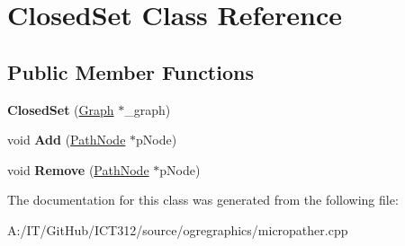 \hypertarget{class_closed_set}{\section{Closed\-Set Class Reference}
\label{class_closed_set}
}
\subsection*{Public Member Functions}
\begin{DoxyCompactItemize}
\item 
\hypertarget{class_closed_set_acf6657729a6bbc37fb44c8c3c582185c}{{\bfseries Closed\-Set} (\hyperlink{classmicropather_1_1_graph}{Graph} $\ast$\-\_\-graph)}\label{class_closed_set_acf6657729a6bbc37fb44c8c3c582185c}

\item 
\hypertarget{class_closed_set_a76c0f439e938b9229f5adff9cd89ab71}{void {\bfseries Add} (\hyperlink{classmicropather_1_1_path_node}{Path\-Node} $\ast$p\-Node)}\label{class_closed_set_a76c0f439e938b9229f5adff9cd89ab71}

\item 
\hypertarget{class_closed_set_a6aae1d2c46516088ec98131508b9103a}{void {\bfseries Remove} (\hyperlink{classmicropather_1_1_path_node}{Path\-Node} $\ast$p\-Node)}\label{class_closed_set_a6aae1d2c46516088ec98131508b9103a}

\end{DoxyCompactItemize}


The documentation for this class was generated from the following file\-:\begin{DoxyCompactItemize}
\item 
A\-:/\-I\-T/\-Git\-Hub/\-I\-C\-T312/source/ogregraphics/micropather.\-cpp\end{DoxyCompactItemize}
